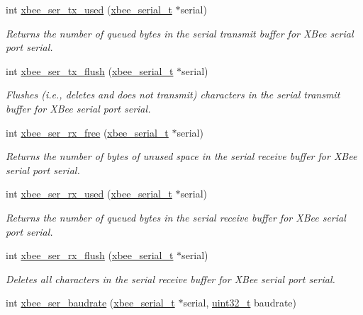 \begin{DoxyCompactItemize}
int \hyperlink{group__hal__win32_gaabf70934d186354cde4ac14ed27d1bd2}{xbee\-\_\-ser\-\_\-tx\-\_\-used} (\hyperlink{structxbee__serial__t}{xbee\-\_\-serial\-\_\-t} $\ast$serial)
\begin{DoxyCompactList}\small\item\em Returns the number of queued bytes in the serial transmit buffer for X\-Bee serial port {\itshape serial}. \end{DoxyCompactList}\item 
int \hyperlink{group__hal__win32_ga05308d37301d27715f1e1308b7189220}{xbee\-\_\-ser\-\_\-tx\-\_\-flush} (\hyperlink{structxbee__serial__t}{xbee\-\_\-serial\-\_\-t} $\ast$serial)
\begin{DoxyCompactList}\small\item\em Flushes (i.\-e., deletes and does not transmit) characters in the serial transmit buffer for X\-Bee serial port {\itshape serial}. \end{DoxyCompactList}\item 
int \hyperlink{group__hal__win32_ga16fb431a1e66861439518e562431821f}{xbee\-\_\-ser\-\_\-rx\-\_\-free} (\hyperlink{structxbee__serial__t}{xbee\-\_\-serial\-\_\-t} $\ast$serial)
\begin{DoxyCompactList}\small\item\em Returns the number of bytes of unused space in the serial receive buffer for X\-Bee serial port {\itshape serial}. \end{DoxyCompactList}\item 
int \hyperlink{group__hal__win32_ga43b8322771cc16b4130fa5330ad2242b}{xbee\-\_\-ser\-\_\-rx\-\_\-used} (\hyperlink{structxbee__serial__t}{xbee\-\_\-serial\-\_\-t} $\ast$serial)
\begin{DoxyCompactList}\small\item\em Returns the number of queued bytes in the serial receive buffer for X\-Bee serial port {\itshape serial}. \end{DoxyCompactList}\item 
int \hyperlink{group__hal__win32_ga98a6d5ceb5e1445e8ef82ccaa65a8c15}{xbee\-\_\-ser\-\_\-rx\-\_\-flush} (\hyperlink{structxbee__serial__t}{xbee\-\_\-serial\-\_\-t} $\ast$serial)
\begin{DoxyCompactList}\small\item\em Deletes all characters in the serial receive buffer for X\-Bee serial port {\itshape serial}. \end{DoxyCompactList}\item 
int \hyperlink{group__hal__win32_gab3c12543a07e0669b672c5cab54b0926}{xbee\-\_\-ser\-\_\-baudrate} (\hyperlink{structxbee__serial__t}{xbee\-\_\-serial\-\_\-t} $\ast$serial, \hyperlink{group__hal__dos_ga09a1e304d66d35dd47daffee9731edaa}{uint32\-\_\-t} baudrate)

\end{DoxyCompactItemize}
